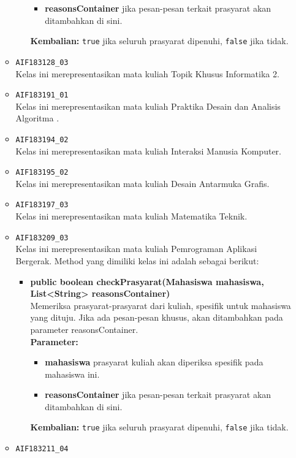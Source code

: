 \begin{enumerate}
\begin{itemize}
\begin{itemize}
\begin{itemize}
				\item \textbf{reasonsContainer} jika pesan-pesan terkait prasyarat akan ditambahkan di sini.
			\end{itemize}
			\textbf{Kembalian:} \texttt{true} jika seluruh prasyarat dipenuhi, \texttt{false} jika tidak.
		\end{itemize}
		\item \texttt{AIF183128\_03} \\
		Kelas ini merepresentasikan mata kuliah Topik Khusus Informatika 2.
		\item \texttt{AIF183191\_01} \\
		Kelas ini merepresentasikan mata kuliah Praktika Desain dan Analisis Algoritma .
		\item \texttt{AIF183194\_02} \\
		Kelas ini merepresentasikan mata kuliah Interaksi Manusia Komputer.
		\item \texttt{AIF183195\_02} \\
		Kelas ini merepresentasikan mata kuliah Desain Antarmuka Grafis.
		\item \texttt{AIF183197\_03} \\
		Kelas ini merepresentasikan mata kuliah Matematika Teknik.
		\item \texttt{AIF183209\_03} \\
		Kelas ini merepresentasikan mata kuliah Pemrograman Aplikasi Bergerak. Method yang dimiliki kelas ini adalah sebagai berikut: 
		\begin{itemize}
			\item \textbf{public boolean checkPrasyarat(Mahasiswa mahasiswa, List<String> reasonsContainer)}\\
			Memeriksa prasyarat-prasyarat dari kuliah, spesifik untuk mahasiswa yang dituju. Jika ada pesan-pesan khusus, akan ditambahkan pada parameter reasonsContainer.\\
			\textbf{Parameter:}
			\begin{itemize}
				\item \textbf{mahasiswa} prasyarat kuliah akan diperiksa spesifik pada mahasiswa ini.
				\item \textbf{reasonsContainer} jika pesan-pesan terkait prasyarat akan ditambahkan di sini.
			\end{itemize}
			\textbf{Kembalian:} \texttt{true} jika seluruh prasyarat dipenuhi, \texttt{false} jika tidak.
		\end{itemize}
		\item \texttt{AIF183211\_04} \\

\end{itemize}
\end{enumerate}
